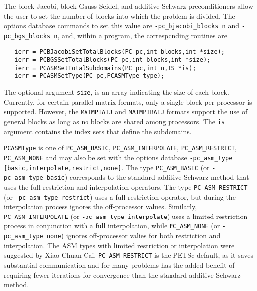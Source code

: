 The block Jacobi, block Gauss-Seidel, and additive Schwarz 
preconditioners allow the user
to set the number of blocks into which the problem is divided.  The
options database commands to set this value are {\tt -pc\_bjacobi\_blocks n}
and {\tt -pc\_bgs\_blocks n}, and, within a program, the corresponding routines
are  
  
\begin{verbatim}
   ierr = PCBJacobiSetTotalBlocks(PC pc,int blocks,int *size);
   ierr = PCBGSSetTotalBlocks(PC pc,int blocks,int *size);
   ierr = PCASMSetTotalSubdomains(PC pc,int n,IS *is);
   ierr = PCASMSetType(PC pc,PCASMType type);
\end{verbatim}
   
The 
optional argument {\tt size}, is an array indicating the size of
each block. Currently, for certain parallel matrix formats, only a
single block per processor is supported. However, the {\tt MATMPIAIJ} and 
{\tt MATMPIBAIJ} formats
support the use of general blocks as long as no blocks are shared
among processors. The {\tt is} argument contains the index sets that
define the subdomains. 

{\tt PCASMType} is one of {\tt PC\_ASM\_BASIC},
{\tt PC\_ASM\_INTERPOLATE}, {\tt PC\_ASM\_RESTRICT}, {\tt PC\_ASM\_NONE}
and may also be set with the options database {\tt -pc\_asm\_type [basic,interpolate,restrict,none]}.
   
  
The type {\tt PC\_ASM\_BASIC} (or {\tt -pc\_asm\_type basic}) corresponds to the
standard additive Schwarz method that uses the full restriction and
interpolation operators.
The type {\tt PC\_ASM\_RESTRICT} (or {\tt -pc\_asm\_type restrict}) uses a full
restriction operator, but during the interpolation process ignores the off-processor
values.
Similarly, {\tt PC\_ASM\_INTERPOLATE} (or {\tt -pc\_asm\_type interpolate}) uses a limited
restriction process in conjunction with a full interpolation, while
{\tt PC\_ASM\_NONE} (or {\tt -pc\_asm\_type none}) ignores off-processor valies
for both restriction and interpolation.
The ASM types with limited restriction or interpolation were suggested by 
Xiao-Chuan Cai.  
{\tt PC\_ASM\_RESTRICT} is the PETSc default, as it saves substantial communication
and for many problems has the added benefit of requiring fewer iterations for convergence
than the standard additive Schwarz method.

